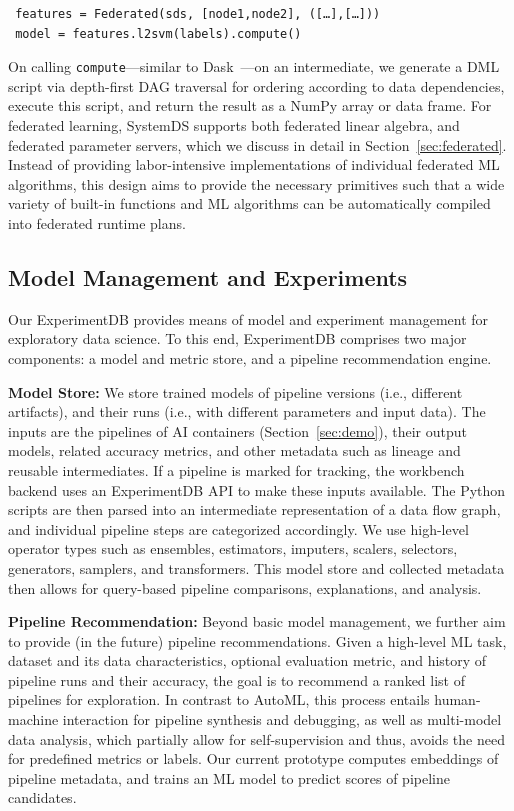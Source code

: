 \documentclass[sigconf,screen]{acmart}
\begin{document}
\small \vspace{0.1cm}
\begin{verbatim}
 features = Federated(sds, [node1,node2], ([…],[…]))
 model = features.l2svm(labels).compute()
\end{verbatim}
\normalsize \vspace{0.1cm}

\noindent On calling \texttt{compute}---similar to Dask~\cite{dask}---on an intermediate, we generate a DML script via depth-first DAG traversal for ordering according to data dependencies, execute this script, and return the result as a NumPy array or data frame. For federated learning, SystemDS supports both federated linear algebra, and federated parameter servers, which we discuss in detail in Section~\ref{sec:federated}. Instead of providing labor-intensive implementations of individual federated ML algorithms, this design aims to provide the necessary primitives such that a wide variety of built-in functions and ML algorithms can be automatically compiled into federated runtime plans.
 
\subsection{Model Management and Experiments}

Our ExperimentDB provides means of model and experiment management for exploratory data science. To this end, ExperimentDB comprises two major components:  a model and metric store, and a pipeline recommendation engine.

\textbf{Model Store:} We store trained models of pipeline versions (i.e., different artifacts), and their runs (i.e., with different parameters and input data). The inputs are the pipelines of AI containers (Section~\ref{sec:demo}), their output models, related accuracy metrics, and other metadata such as lineage and reusable intermediates. If a pipeline is marked for tracking, the workbench backend uses an ExperimentDB API to make these inputs available. The Python scripts are then parsed into an intermediate representation of a data flow graph, and individual pipeline steps are categorized accordingly. We use high-level operator types such as ensembles, estimators, imputers, scalers, selectors, generators, samplers, and transformers. This model store and collected metadata then allows for query-based pipeline comparisons, explanations, and analysis.
 
\textbf{Pipeline Recommendation:} Beyond basic model management, we further aim to provide (in the future) pipeline recommendations. Given a high-level ML task, dataset and its data characteristics, optional evaluation metric, and history of pipeline runs and their accuracy, the goal is to recommend a ranked list of pipelines for exploration. In contrast to AutoML, this process entails human-machine interaction for pipeline synthesis and debugging, as well as multi-model data analysis, which partially allow for self-supervision and thus, avoids the need for predefined metrics or labels. Our current prototype computes embeddings of pipeline metadata, and trains an ML model to predict scores of pipeline candidates.
\end{document}
